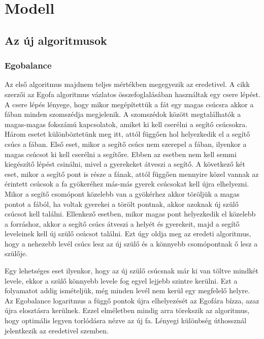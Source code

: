 \documentclass[12pt]{report}
\begin{document}
\chapter{Modell}

\section{Az új algoritmusok}

\subsection{Egobalance}

Az első algoritmus majdnem teljes mértékben megegyezik az eredetivel.
A cikk szerzői az Egofa algoritmus vázlatos összefoglalásában használtak egy csere lépést.
A csere lépés lényege, hogy mikor megépítettük a fát egy magas csúcsra akkor a fában minden szomszédja megjelenik.
A szomszédok között megtalálhatók a magas-magas fokszámú kapcsolatok, amiket ki kell cserélni a segítő csúcsokra.
Három esetet különböztetünk meg itt, attól függően hol helyezkedik el a segítő csúcs a fában.
Első eset, mikor a segítő csúcs nem szerepel a fában, ilyenkor a magas csúcsot ki kell cserélni a segítőre. Ebben az esetben nem kell semmi kiegészítő lépést csinálni, mivel a gyerekeket átveszi a segítő.
A következő két eset, mikor a segítő pont is része a fának, attól függően mennyire közel vannak az érintett csúcsok a fa gyökeréhez más-más gyerek csúcsokat kell újra elhelyezni.
Mikor a segítő csomópont közelebb van a gyökérhez akkor töröljük a magas pontot a fából, ha voltak gyerekei a törölt pontnak, akkor azoknak új szülő csúcsot kell találni.
Ellenkező esetben, mikor magas pont helyezkedik el közelebb a forráshoz, akkor a segítő csúcs átveszi a helyét és gyerekeit, majd a segítő leveleinek kell új szülő csúcsot találni. 
Ezt úgy oldja meg az eredeti algoritmus, hogy a nehezebb levél csúcs lesz az új szülő és a könnyebb csomópontnak ő lesz a szülője.

Egy lehetséges eset ilyenkor, hogy az új szülő csúcsnak már ki van töltve mindkét levele, ekkor a szülő könnyebb levele fog egyel lejjebb szintre kerülni.
Ezt a folyamatot addig ismételjük, még minden levél nem kerül egy megfelelő helyre.
Az Egobalance logaritmus a függő pontok újra elhelyezését az Egofára bízza, azaz újra elosztásra kerülnek.
Ezzel elméletben mindig arra törekszik az algoritmus, hogy optimális legyen torlódásra nézve az új fa.
Lényegi különbség úthossznál jelentkezik az eredetivel szemben.
\end{document}
